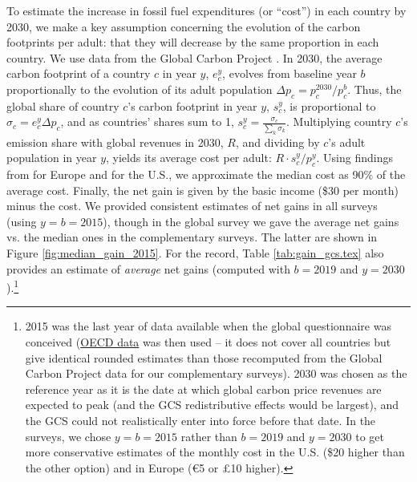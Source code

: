 To estimate the increase in fossil fuel expenditures (or ``cost'') in each country by 2030, we make a key assumption concerning the evolution of the carbon footprints per adult: that they will decrease by the same proportion in each country. We use data from the Global Carbon Project \citep{peters_synthesis_2012}. In 2030, the average carbon footprint of a country $c$ in year $y$, $e_c^y$, evolves from baseline year $b$ proportionally to the evolution of its adult population $\Delta p_c = p^{2030}_c/p^b_c$. Thus, the global share of country $c$'s carbon footprint in year $y$, $s_c^y$, is proportional to $\sigma_c = e^y_c \Delta p_c$, and as countries' shares sum to 1, $s_c^y = \frac{\sigma_c}{\sum_k \sigma_k}$. Multiplying country $c$'s emission share with global revenues in 2030, $R$, and dividing by $c$'s adult population in year $y$, yields its average cost per adult: $R \cdot s_c^y / p^y_c$. %
Using findings from \citet{ivanova_unequal_2020} for Europe and \citet{fremstad_impact_2019} for the U.S., we approximate the median cost as 90\% of the average cost. Finally, the net gain is given by the basic income (\$30 per month) minus the cost. We provided consistent estimates of net gains in all surveys (using $y = b = 2015$), though in the global survey we gave the average net gains vs. the median ones in the complementary surveys. The latter are shown in Figure \ref{fig:median_gain_2015}. 
For the record, Table \ref{tab:gain_gcs.tex} also provides an estimate of \textit{average} net gains (computed with $b = 2019$ and $y = 2030$).\footnote{2015 was the last year of data available when the global questionnaire was conceived (\href{https://stats.oecd.org/Index.aspx?DataSetCode=IO_GHG_2019}{OECD data} was then used -- it does not cover all countries but give identical rounded estimates than those recomputed from the Global Carbon Project data for our complementary surveys). 2030 was chosen as the reference year as it is the date at which global carbon price revenues are expected to peak (and the GCS redistributive effects would be largest), and the GCS could not realistically enter into force before that date. In the surveys, we chose $y = b = 2015$ rather than $b = 2019$ and $y = 2030$ to get more conservative estimates of the monthly cost in the U.S. (\$20 higher than the other option) and in Europe (\euro{5} or £10 higher).}%

